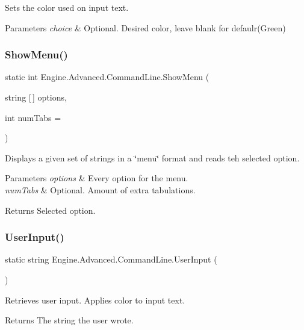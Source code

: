 Sets the color used on input text. 


\begin{DoxyParams}{Parameters}
{\em choice} & Optional. Desired color, leave blank for defaulr(\+Green)\\
\hline
\end{DoxyParams}
\mbox{\label{class_engine_1_1_advanced_1_1_command_line_a1cb5e1866e37ec8a7b7db7a6d6e7766e}} 
\subsubsection{\texorpdfstring{ShowMenu()}{ShowMenu()}}
{\footnotesize\ttfamily static int Engine.\+Advanced.\+Command\+Line.\+Show\+Menu (\begin{DoxyParamCaption}\item[{string \mbox{[}$\,$\mbox{]}}]{options,  }\item[{int}]{num\+Tabs = {} }\end{DoxyParamCaption})\hspace{0.3cm}{\ttfamily [static]}}



Displays a given set of strings in a \char`\"{}menu\char`\"{} format and reads teh selected option. 


\begin{DoxyParams}{Parameters}
{\em options} & Every option for the menu.\\
\hline
{\em num\+Tabs} & Optional. Amount of extra tabulations.\\
\hline
\end{DoxyParams}
\begin{DoxyReturn}{Returns}
Selected option.
\end{DoxyReturn}
\mbox{\label{class_engine_1_1_advanced_1_1_command_line_af50fbfb487964b724388fcf401ee3aad}} 
\subsubsection{\texorpdfstring{UserInput()}{UserInput()}}
{\footnotesize\ttfamily static string Engine.\+Advanced.\+Command\+Line.\+User\+Input (\begin{DoxyParamCaption}{ }\end{DoxyParamCaption})\hspace{0.3cm}{\ttfamily [static]}}



Retrieves user input. Applies color to input text. 

\begin{DoxyReturn}{Returns}
The string the user wrote.
\end{DoxyReturn}
